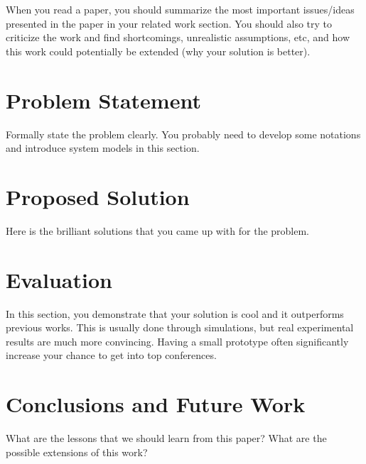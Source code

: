 \documentclass[11pt, draftclsnofoot, onecolumn]{IEEEtran}
\begin{document}
When you read a paper, you should summarize the most important issues/ideas
presented in the paper in your related work section.  You should also try to
criticize the work and find shortcomings, unrealistic assumptions, etc, and how
this work could potentially be extended (why your solution is better). 

\section{Problem Statement} \label{sec:problem}

Formally state the problem clearly. You probably need to develop some notations
and introduce system models in this section. 

\section{Proposed Solution} \label{sec:solution}

Here is the brilliant solutions that you came up with for the problem. 

\section{Evaluation} \label{sec:evaluation}

In this section, you demonstrate that your solution is cool and it outperforms
previous works. This is usually done through simulations, but real experimental
results are much more convincing. Having a small prototype often significantly
increase your chance to get into top conferences. 

\section{Conclusions and Future Work} \label{sec:conclusion}

What are the lessons that we should learn from this paper? 
What are the possible extensions of this work?

   
\end{document}
